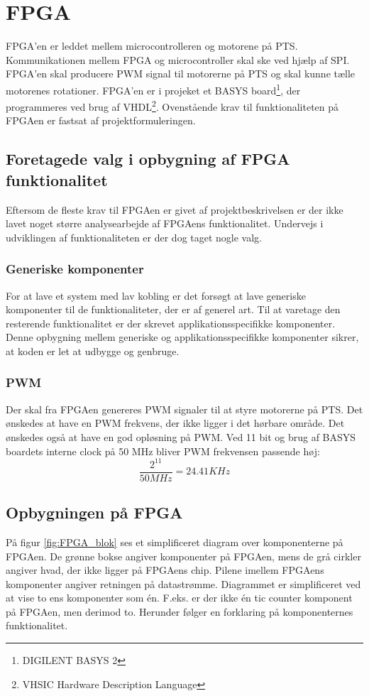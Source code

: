 \section{FPGA}
\label{sec:FPGA}
FPGA'en er leddet mellem microcontrolleren og motorene på PTS. 
Kommunikationen mellem FPGA og microcontroller skal ske ved hjælp af SPI. 
FPGA'en skal producere PWM signal til motorerne på PTS og skal kunne tælle motorenes rotationer. 
FPGA'en er i projeket et BASYS board\footnote{DIGILENT BASYS 2}, der programmeres ved brug af VHDL\footnote{VHSIC Hardware Description Language}.
Ovenstående krav til funktionaliteten på FPGAen er fastsat af 
projektformuleringen.

\subsection{Foretagede valg i opbygning af FPGA funktionalitet}
Eftersom de fleste krav til FPGAen er givet af projektbeskrivelsen er der ikke 
lavet noget større analysearbejde af FPGAens funktionalitet. Undervejs i 
udviklingen af funktionaliteten er der dog taget nogle valg.

\subsubsection*{Generiske komponenter}
For at lave et system med lav kobling er det forsøgt at lave 
generiske komponenter til de funktionaliteter, der er af generel art. 
Til at varetage den resterende funktionalitet er der skrevet applikationsspecifikke 
komponenter.
Denne opbygning mellem generiske og applikationsspecifikke komponenter sikrer, at koden er let at 
udbygge og genbruge.

\subsubsection*{PWM}
Der skal fra FPGAen genereres PWM signaler til at styre motorerne på PTS.
Det ønskedes at have en PWM frekvens, der ikke ligger i det hørbare område. 
Det ønskedes også at have en god opløsning på PWM. 
Ved 11 bit og brug af BASYS boardets interne clock på 50 MHz bliver PWM frekvensen passende høj:
\begin{equation}
  \frac{2^{11}}{50 MHz} = 24.41 KHz 
\end{equation}

\subsection{Opbygningen på FPGA}
På figur \ref{fig:FPGA_blok} ses et simplificeret diagram over komponenterne på FPGAen. 
De grønne bokse angiver komponenter på FPGAen, mens de grå cirkler angiver hvad, der ikke ligger på 
FPGAens chip. Pilene imellem FPGAens komponenter angiver retningen på 
datastrømme. Diagrammet er simplificeret ved at vise to ens komponenter som én. 
F.eks. er der ikke én tic counter komponent på FPGAen, men derimod to.
Herunder følger en forklaring på komponenternes funktionalitet.


